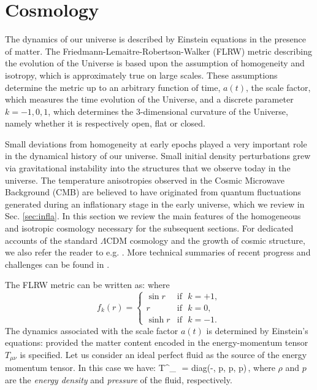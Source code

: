 \startdocument

\section{Cosmology}
\label{SecCO}

The dynamics of our universe is described by Einstein equations in the presence of matter. The Friedmann-Lemaitre-Robertson-Walker (FLRW) metric describing the evolution of the Universe  is based upon the assumption of homogeneity and isotropy, which is approximately true on large scales. These assumptions  determine the metric up to an arbitrary function of time, $a(t)$, the scale factor, which measures the time evolution of the Universe, and a discrete parameter $k = -1,0,1$, which determines the 3-dimensional curvature of the Universe, namely whether it is respectively open, flat or closed.

Small deviations from homogeneity at early epochs played a very important role in the dynamical history of our universe. Small initial density perturbations grew via gravitational instability into the structures that we observe today in the universe. The temperature anisotropies observed in the Cosmic Microwave Background (CMB) are believed to have originated from quantum fluctuations generated during an inflationary stage in the early universe, which we review in Sec. \ref{sec:infla}. In this section we review the main features of the homogeneous and isotropic cosmology necessary for the subsequent sections. For dedicated accounts of the standard $\Lambda$CDM cosmology and the growth of cosmic structure, we also refer the reader to e.g. \cite{Dodelson:2003ft, Weinberg:2008zzc, Mukhanov:2005sc, Baumann:2022mni}. More technical summaries of recent progress and challenges can be found in  \cite{Chou:2022luk, Green:2022hhj, Flauger:2022hie}.
\bigskip

The FLRW metric can be written as:
\be\label{eq:FLRW}
\setlength\fboxsep{0.25cm}
\setlength\fboxrule{0.4pt}
\ee
where
\begin{equation*}
f_k(r) =  \left\{
\begin{array}{rl}
\sin r  & \text{if }\,\, k = +1 ,\\
r & \text{if }\,\, k = 0,\\
\sinh r & \text{if } \,\, k =-1.
\end{array} \right.
\end{equation*}
The dynamics associated with the scale factor $a(t)$ is determined by Einstein's equations:
\be\label{eq:Einstein4D}
\setlength\fboxsep{0.25cm}
\setlength\fboxrule{0.4pt}
\ee
 provided the matter content encoded in the energy-momentum tensor $T_{\mu\nu}$  is specified. Let us consider an ideal perfect fluid as the source of
the energy momentum tensor. In this case we have:
\be\label{eq:EMT4D}
 T^\mu_{\,\,\nu} = {\rm diag}\left(-\rho, p, p, p\right)\,,
 \ee
 where  $\rho$ and  $p$ are the {\em energy density} and {\em pressure} of the fluid, respectively.

